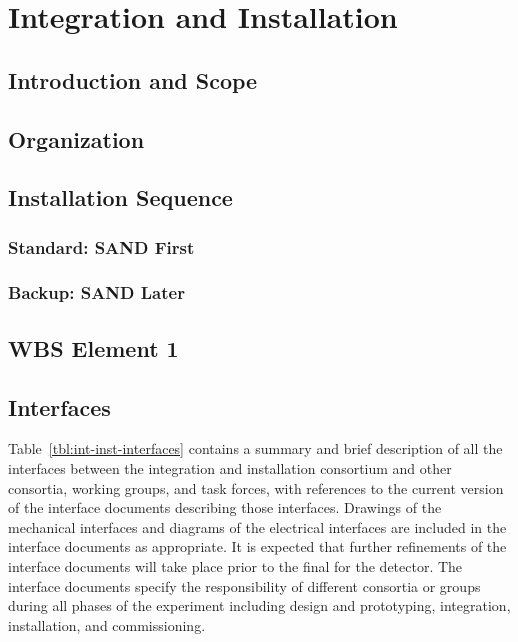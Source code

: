 \chapter{Integration and Installation}
\label{ch:int-inst}

\section{Introduction and Scope}
\label{sec:int-inst-ovvw-intro}


\section{Organization}
\label{sec:int-inst-org}

\section{Installation Sequence}
\label{sec:int-inst-seq}

\subsection{Standard: SAND First}
\label{sec:int-inst-seq-std}

\subsection{Backup: SAND Later}
\label{sec:int-inst-seq-bkup}

\section{WBS Element 1}
\label{sec:int-inst-wbs1}


\section{Interfaces}
\label{sec:int-inst-interface}

Table~\ref{tbl:int-inst-interfaces} contains a summary and brief description of all the interfaces between the integration and installation consortium and other consortia, working groups, and task forces, with references to the current version of the interface documents describing those interfaces.  
Drawings of the mechanical interfaces and diagrams of the electrical interfaces are 
included in the interface documents as appropriate.
It is expected that further refinements of the interface documents will take place prior to the final  for the detector. The interface documents specify the responsibility of different consortia or groups during all phases of the experiment including design and prototyping, integration,  installation, and  commissioning.


